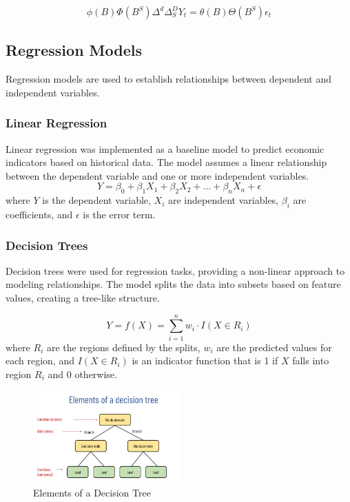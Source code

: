 \begin{equation}
  \phi(B) \Phi(B^S) \Delta^d \Delta_S^D Y_t = \theta(B) \Theta(B^S) \epsilon_t
\end{equation}

\subsection{Regression Models}
\label{sec:regression-models}
Regression models are used to establish relationships between dependent and independent variables.

\subsubsection{Linear Regression}
\label{sec:linear-regression}
Linear regression was implemented as a baseline model to predict economic indicators based on historical data. The model assumes a linear relationship between the dependent variable and one or more independent variables.
\begin{equation}
  Y = \beta_0 + \beta_1 X_1 + \beta_2 X_2 + ... + \beta_n X_n + \epsilon
\end{equation}
where $Y$ is the dependent variable, $X_i$ are independent variables, $\beta_i$ are coefficients, and $\epsilon$ is the error term.

\subsubsection{Decision Trees}
\label{sec:decision-trees}
Decision trees were used for regression tasks, providing a non-linear approach to modeling relationships. The model splits the data into subsets based on feature values, creating a tree-like structure.

\begin{equation}
  Y = f(X) = \sum_{i=1}^{n} w_i \cdot I(X \in R_i)
\end{equation}
where $R_i$ are the regions defined by the splits, $w_i$ are the predicted values for each region, and $I(X \in R_i)$ is an indicator function that is 1 if $X$ falls into region $R_i$ and 0 otherwise.

\begin{figure}[H]
  \centering
  \includegraphics[width=0.5\textwidth]{../images/decision-tree.png}
  \caption{Elements of a Decision Tree}
  \label{fig:decision-tree}
\end{figure}

